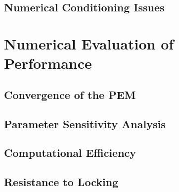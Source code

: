 \subsection{Numerical Conditioning Issues}

\section{Numerical Evaluation of Performance}
\subsection{Convergence of the PEM}
\subsection{Parameter Sensitivity Analysis}
\subsection{Computational Efficiency}
\subsection{Resistance to Locking}
